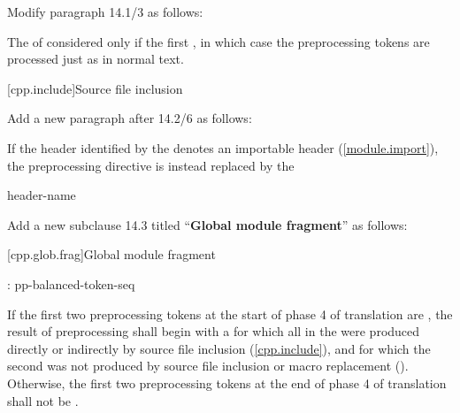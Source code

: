 Modify paragraph 14.1/3 as follows:

\begin{std.txt}
\pnum[3]
The 
of 
  considered
only if  the first 
,
in which case the preprocessing tokens are processed just as in normal text.
\end{std.txt}

\setcounter{section}{1}
[cpp.include]{Source file inclusion}%

\begin{after}
Add a new paragraph after 14.2/6 as follows:

\begin{std.txt}
\color{addclr}
\pnum[7]
If the header identified by the 
denotes an importable header (\ref{module.import}),
the preprocessing directive
is instead replaced by the 

\begin{bnf}
 header-name \terminal{;}
\end{bnf}
\end{std.txt}
\end{after}

\noindent
Add a new subclause 14.3 titled ``\textbf{Global module fragment}'' as follows:

\setcounter{section}{2}
[cpp.glob.frag]{Global module fragment}%

\begin{std.txt}
\color{addclr}
\begin{bnf}
:\br
   \terminal{;} pp-balanced-token-seq 
\end{bnf}

\pnum
If the first two preprocessing tokens at the start of phase 4 of translation
are  \tcode{;}, the result of preprocessing shall begin with
a  for which all
 in the 
were produced directly or indirectly by source file inclusion
(\ref{cpp.include}), and for which the second 
 was not produced by source file inclusion or
macro replacement ().
Otherwise, the first two preprocessing tokens at the end of phase 4 of
translation shall not be  \tcode{;}.
\end{std.txt}

